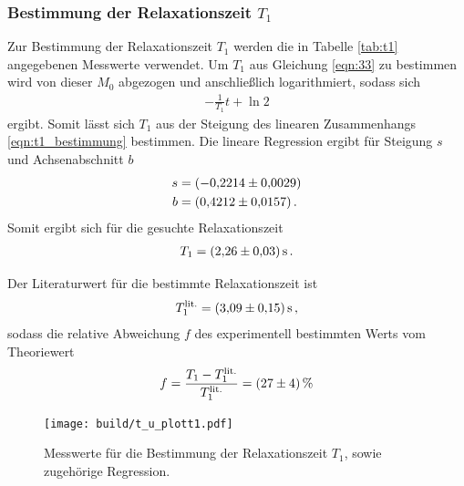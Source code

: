 \subsubsection{Bestimmung der Relaxationszeit $T_{1}$}
\label{subsubsec:T1}
Zur Bestimmung der Relaxationszeit $T_{1}$ werden die in Tabelle \ref{tab:t1} angegebenen
Messwerte verwendet. Um $T_{1}$ aus Gleichung \eqref{eqn:33} zu bestimmen wird von dieser $M_{0}$ abgezogen und anschließlich logarithmiert, sodass sich
\begin{align}
  \label{eqn:t1_bestimmung}
  -\frac{1}{T_{1}} t + \ln 2
\end{align}
ergibt.
Somit lässt sich $T_{1}$ aus der Steigung des linearen Zusammenhangs \eqref{eqn:t1_bestimmung} bestimmen.
Die lineare Regression ergibt für Steigung $s$ und Achsenabschnitt $b$
\begin{align*}
  s &= \SI{-0.2214+-0.0029}{}\\
  b &= \SI{0.4212+-0.0157}{} \, .
\end{align*}
Somit ergibt sich für die gesuchte Relaxationszeit
\begin{align*}
  T_{1} = \SI{2.26+-0.03}{\second} \, .
\end{align*}


Der Literaturwert\cite{litwerte} für die bestimmte Relaxationszeit ist
\begin{align*}
  T_{1}^\text{lit.} = \SI{3.09+-0.15}{\second} \, ,
\end{align*}
sodass die relative Abweichung $f$ des experimentell bestimmten Werts
vom Theoriewert
\begin{align*}
  f = \frac{T_{1} - T_{1}^\text{lit.}}{T_{1}^\text{lit.}} = \SI{27+-4}{\percent}
\end{align*}


\begin{figure}[hhh]
  \centering
  \texttt{[image: build/t\_u\_plott1.pdf]}
  \caption{Messwerte für die Bestimmung der Relaxationszeit $T_{1}$, sowie zugehörige Regression.}
  \label{fig:meiboomgill}
\end{figure}


